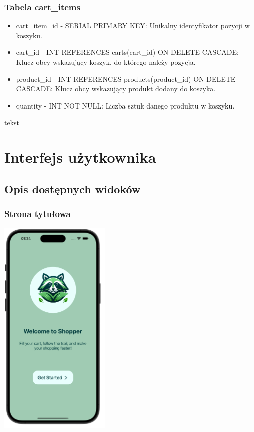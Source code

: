 \subsubsection{Tabela cart\_items}
\begin{itemize}
\item cart\_item\_id - SERIAL PRIMARY KEY: Unikalny identyfikator pozycji w koszyku.
\item cart\_id - INT REFERENCES carts(cart\_id) ON DELETE CASCADE: Klucz obcy wskazujący koszyk, do którego należy pozycja.
\item product\_id - INT REFERENCES products(product\_id) ON DELETE CASCADE: Klucz obcy wskazujący produkt dodany do koszyka.
\item quantity - INT NOT NULL: Liczba sztuk danego produktu w koszyku.
\end{itemize}

tekst

\section{Interfejs użytkownika}

\subsection{Opis dostępnych widoków}

\subsubsection{Strona tytułowa}

\begin{center} \includegraphics[width=0.4\textwidth]{images/front/home_page.png} \end{center}

